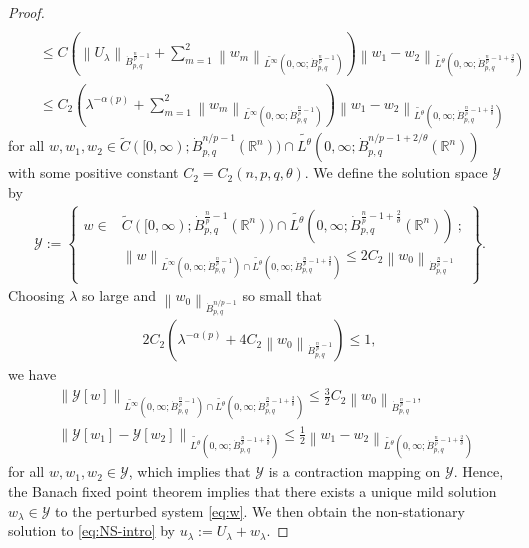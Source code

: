 \documentclass[a4paper,12pt,reqno]{amsart}
\theoremstyle{plain}
\theoremstyle{definition}
\newcommand{\dB}{\dot{B}}
\renewcommand{\leq}{\leqslant}
\newcommand{\n}[1]{{\left\|#1\right\|}}
\newcommand{\R}{\mathbb{R}}
\newcommand{\Mp}[1]{\left\{#1\right\}}
\renewcommand{\sp}[1]{\left(#1\right)}
\begin{document}
\begin{proof}
\begin{align}
    \\
    &\quad
    \leq{}
    C
    \sp{
    \n{U_{\lambda}}_{\dB_{p,q}^{\frac{n}{p}-1}}
    +
    \sum_{m=1}^2\n{w_m}_{\widetilde{L^{\infty}}(0,\infty;\dB_{p,q}^{\frac{n}{p}-1})}
    }
    \n{w_1-w_2}_{\widetilde{L^{\theta}}(0,\infty;\dB_{p,q}^{\frac{n}{p}-1+\frac{2}{\theta}})}
    \\
    &\quad
    \leq{}
    C_2
    \sp{
    \lambda^{-\alpha(p)}
    +
    \sum_{m=1}^2\n{w_m}_{\widetilde{L^{\infty}}(0,\infty;\dB_{p,q}^{\frac{n}{p}-1})}
    }
    \n{w_1-w_2}_{\widetilde{L^{\theta}}(0,\infty;\dB_{p,q}^{\frac{n}{p}-1+\frac{2}{\theta}})}
\end{align}
for all $w,w_1,w_2 \in \widetilde{C}([0,\infty);\dB_{p,q}^{n/p-1}(\R^n))\cap \widetilde{L^{\theta}}(0,\infty;\dB_{p,q}^{n/p-1+2/\theta}(\R^n))$ with some positive constant $C_2=C_2(n,p,q,\theta)$.
We define the solution space $\mathscr{Y}$ by
\begin{align}
    \mathscr{Y}
    :=
    \Mp{
    \begin{aligned}
    w \in {}&
    \widetilde{C}([0,\infty);\dB_{p,q}^{\frac{n}{p}-1}(\R^n))
    \cap 
    \widetilde{L^{\theta}}(0,\infty;\dB_{p,q}^{\frac{n}{p}-1+\frac{2}{\theta}}(\R^n))
    \ ;\\
    &
    \n{w}_{\widetilde{L^{\infty}}(0,\infty;\dB_{p,q}^{\frac{n}{p}-1})\cap\widetilde{L^{\theta}}(0,\infty;\dB_{p,q}^{\frac{n}{p}-1+\frac{2}{\theta}})}
    \leq 
    2C_2\n{w_0}_{\dB_{p,q}^{\frac{n}{p}-1}}
    \end{aligned}
    }.
\end{align}
Choosing $\lambda$ so large and $\n{w_0}_{\dB_{p,q}^{n/p-1}}$ so small that
\begin{align}
    2C_2\sp{\lambda^{-\alpha(p)} + 4C_2\n{w_0}_{\dB_{p,q}^{\frac{n}{p}-1}}} \leq 1,
\end{align}
we have
\begin{align}
    &
    \n{\mathcal{Y}[w]}_{\widetilde{L^{\infty}}(0,\infty;\dB_{p,q}^{\frac{n}{p}-1})\cap\widetilde{L^{\theta}}(0,\infty;\dB_{p,q}^{\frac{n}{p}-1+\frac{2}{\theta}})}
    \leq 
    \frac{3}{2}C_2\n{w_0}_{\dB_{p,q}^{\frac{n}{p}-1}},
    \\
    &
    \n{\mathcal{Y}[w_1]-\mathcal{Y}[w_2]}_{\widetilde{L^{\theta}}(0,\infty;\dB_{p,q}^{\frac{n}{p}-1+\frac{2}{\theta}})}
    \leq 
    \frac{1}{2}
    \n{w_1-w_2}_{\widetilde{L^{\theta}}(0,\infty;\dB_{p,q}^{\frac{n}{p}-1+\frac{2}{\theta}})}
\end{align}
for all $w,w_1,w_2 \in \mathscr{Y}$,
which implies that
$\mathcal{Y}$ is a contraction mapping on $\mathscr{Y}$.
Hence, the Banach fixed point theorem implies that there exists a unique mild solution $w_{\lambda} \in \mathscr{Y}$ to the perturbed system \eqref{eq:w}.
We then obtain the non-stationary solution to \eqref{eq:NS-intro} by $u_{\lambda}:=U_{\lambda}+w_{\lambda}$.


\end{proof}
\end{document}
